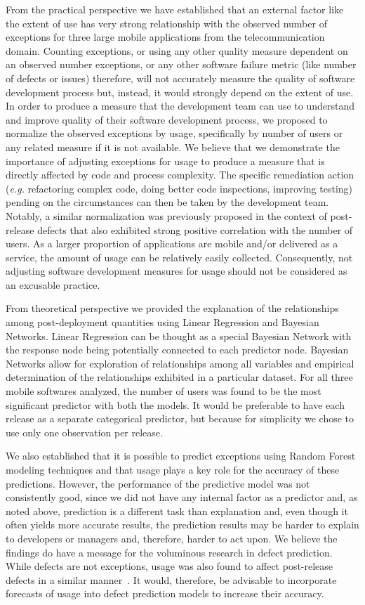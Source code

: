 \documentclass[smallcondensed]{svjour3}     %
\begin{document}
From the practical perspective we have established
that an external factor like the extent of use has very 
strong relationship with the observed number
of exceptions for three large mobile applications from 
the telecommunication domain. Counting exceptions, or using any other quality 
measure dependent on an observed number exceptions, or any other 
software failure metric (like number of defects or issues) 
therefore, will not accurately measure the quality of software
development process but, instead, it would strongly depend on the
extent of use. In order to produce a measure that the development
team can use to understand and improve quality of their software
development process, we proposed to normalize the observed exceptions by usage, 
specifically by number of users or any related measure if it is not 
available. We believe that we demonstrate the importance of adjusting exceptions for usage to produce a measure that is directly affected by code and process complexity. The specific remediation action (\emph{e.g.} refactoring complex code, doing better code inspections, improving testing)  pending on the circumstances can then be taken by the development team. 
Notably, a similar
normalization was previously proposed in the context of post-release
defects that also exhibited strong positive correlation with the
number of users.  As a larger proportion of applications are mobile
and/or delivered as a service, the amount of usage can be relatively
easily collected.  Consequently, not adjusting software
development measures for usage should not be considered as an
excusable practice.

From theoretical perspective we provided the explanation of the
relationships among post-deployment quantities using Linear
Regression and Bayesian Networks. Linear Regression can be thought
as a special Bayesian Network with the response node being
potentially connected to each predictor node. Bayesian Networks
allow for exploration of relationships among all variables and
empirical determination of the relationships exhibited in a
particular dataset.  For all three mobile softwares analyzed, the number of users was found to be the most significant predictor with both the models. It would be preferable to have each release as a separate
categorical predictor, but because for simplicity we chose to use
only one observation per release.

We also established
that it is possible to predict exceptions using Random Forest
modeling techniques and that usage plays a key role for the accuracy
of these predictions. However, the performance of the predictive model 
was not consistently good, since we did not have any internal factor as a 
predictor and, as noted above, prediction is a different task
than explanation and, even though it often yields more accurate
results, the prediction results may be harder to explain to
developers or managers and, therefore, harder to act upon. We
believe the findings do have a message for the voluminous research
in defect prediction. While defects are not exceptions, usage was
also found to affect post-release defects in a similar
manner~\cite{caper,hmps15,mockus2005predictors}. It would, therefore, be advisable to 
incorporate forecasts of usage into defect prediction models  to increase their accuracy.
\end{document}

